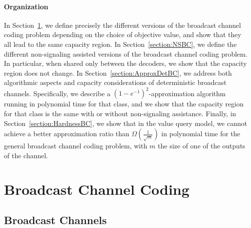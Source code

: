 \paragraph{Organization} In Section~\ref{section:BCCpb}, we define precisely the different versions of the broadcast channel coding problem depending on the choice of objective value, and show that they all lead to the same capacity region. In Section~\ref{section:NSBC}, we define the different non-signaling assisted versions of the broadcast channel coding problem. In particular, when shared only between the decoders, we show that the capacity region does not change. In Section~\ref{section:ApproxDetBC}, we address both algorithmic aspects and capacity considerations of deterministic broadcast channels. Specifically, we describe a $(1-e^{-1})^2$-approximation algorithm running in polynomial time for that class, and we show that the capacity region for that class is the same with or without non-signaling assistance. Finally, in Section~\ref{section:HardnessBC}, we show that in the value query model, we cannot achieve a better approximation ratio than $\Omega\left(\frac{1}{\sqrt{m}}\right)$ in polynomial time for the general broadcast channel coding problem, with $m$ the size of one of the outputs of the channel.

\section{Broadcast Channel Coding}
\label{section:BCCpb}
\subsection{Broadcast Channels}

